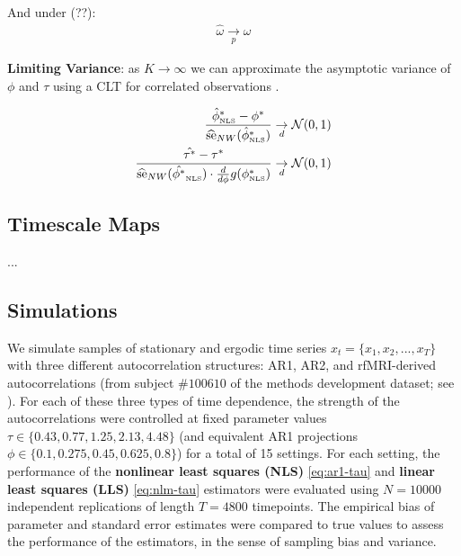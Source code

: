 \documentclass[main.tex]{subfiles}
\begin{document}
And under (??):\\
\begin{align}
\hat \omega \underset{p}{\to} \omega
\end{align}

\textbf{Limiting Variance}: as $K\to\infty$ we can approximate the asymptotic variance of $\phi$ and $\tau$ using a CLT for correlated observations \citep[theorem~23.2]{hansen_econometrics_2022}.

\begin{align}
\frac{\hat\phi^*_{\scriptscriptstyle\scriptscriptstyle\text{NLS}} - \phi^*}{\widehat{\text{se}}_{NW}(\hat\phi^*_{\scriptscriptstyle\text{NLS}})} \underset{d}{\to} \mathcal{N}(0, 1) \label{eq:nls-phi-clt}\\
\frac{\hat{\tau^*} - \tau^*}{\widehat{\text{se}}_{NW}(\hat{\phi^*}_{\scriptscriptstyle\text{NLS}}) \cdot \frac{d}{d\phi}g(\phi^*_{\scriptscriptstyle\text{NLS}})} \underset{d}{\to} \mathcal{N}(0,1)
\end{align}

\subsection{Timescale Maps}
...

\subsection{Simulations}\label{sec:simulations}
 
We simulate samples of stationary and ergodic time series $x_t = \{x_1, x_2, ..., x_T\}$ with three different autocorrelation structures: AR1, AR2, and rfMRI-derived autocorrelations (from subject $\#100610$ of the methods development dataset; see ). For each of these three types of time dependence, the strength of the autocorrelations were controlled at fixed parameter values $\tau \in \{0.43, 0.77, 1.25, 2.13, 4.48\}$ (and equivalent AR1 projections $\phi \in \{0.1, 0.275, 0.45, 0.625, 0.8\}$) for a total of 15 settings. For each setting, the performance of the \textbf{nonlinear least squares (NLS)} \eqref{eq:ar1-tau} and \textbf{linear least squares (LLS)} \eqref{eq:nlm-tau} estimators were evaluated using $N = 10000$ independent replications of length $T=4800$ timepoints. The empirical bias of parameter and standard error estimates were compared to true values to assess the performance of the estimators, in the sense of sampling bias and variance. \\
\end{document}
